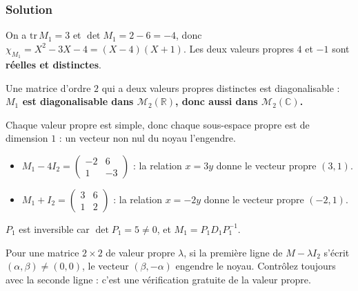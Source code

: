 \documentclass[11pt,a4paper]{article}
\providecommand{\tightlist}{\setlength{\itemsep}{0pt}\setlength{\parskip}{0pt}}
\newcommand{\equationajustee}[1]{%
  \sbox{\boiteequation}{$\displaystyle #1$}%
  \ifdim\wd\boiteequation>\linewidth
    \[\resizebox{\linewidth}{!}{\usebox{\boiteequation}}\]%
  \else
    \[#1\]%
  \fi}
\begin{document}
\hypertarget{solution-1}{%
\subsubsection{Solution}\label{solution-1}}

On a \(\mathrm{tr}\,M_1=3\) et \(\det M_1=2-6=-4\), donc \(\chi_{M_1}=X^2-3X-4=(X-4)(X+1)\). Les deux valeurs propres \(4\) et \(-1\) sont \textbf{réelles et distinctes}.

Une matrice d'ordre \(2\) qui a deux valeurs propres distinctes est diagonalisable : \textbf{\(M_1\) est diagonalisable dans \({\mathcal{M}}_2(\mathbb{R})\), donc aussi dans \({\mathcal{M}}_2(\mathbb{C})\).}

Chaque valeur propre est simple, donc chaque sous-espace propre est de dimension \(1\) : un vecteur non nul du noyau l'engendre.

\begin{itemize}
\tightlist
\item
  \(M_1-4I_2=\begin{pmatrix}-2&6\\1&-3\end{pmatrix}\) : la relation \(x=3y\) donne le vecteur propre \((3,1)\).
\item
  \(M_1+I_2=\begin{pmatrix}3&6\\1&2\end{pmatrix}\) : la relation \(x=-2y\) donne le vecteur propre \((-2,1)\).
\end{itemize}

\equationajustee{\boxed{P_1=\begin{pmatrix}3&-2\\1&1\end{pmatrix},\qquad D_1=\begin{pmatrix}4&0\\0&-1\end{pmatrix}}}

\(P_1\) est inversible car \(\det P_1=5\neq0\), et \(M_1=P_1D_1P_1^{-1}\).

\begin{methode}

Pour une matrice \(2\times2\) de valeur propre \(\lambda\), si la première ligne de \(M-\lambda I_2\) s'écrit \((\alpha,\beta)\neq(0,0)\), le vecteur \((\beta,-\alpha)\) engendre le noyau. Contrôlez toujours avec la seconde ligne : c'est une vérification gratuite de la valeur propre.

\end{methode}
\end{document}
